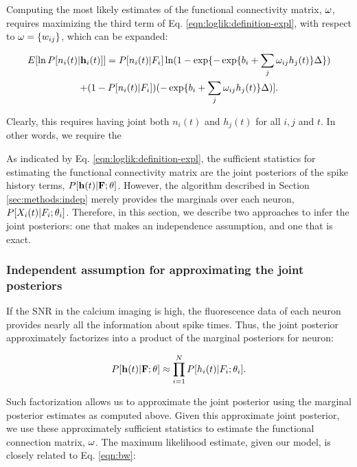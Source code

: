 Computing the most likely estimates of the functional connectivity matrix, $\mathbf{\omega}$, requires maximizing the third term of Eq. \eqref{eqn:loglik:definition-expl}, with respect to $\mathbf{\omega}=\{w_{ij}\}$, which can be expanded:

\begin{multline} \label{eqn:bws}
	E [\ln P[n_i(t) | \mathbf{h}_i(t)]] = P[n_i(t) | F_i] \ln (1-\exp\{-\exp\{b_i + \sum_j \omega_{ij} h_j(t)\}\Delta\})
	\\ +  (1-P[n_i(t) | F_i]) (-\exp\{b_i + \sum_j \omega_{ij} h_j(t)\}\Delta)].
\end{multline}

\noindent Clearly, this requires having joint both $n_i(t)$ and $h_j(t)$ for all $i,j$ and $t$.  In other words, we require the 

As indicated by Eq. \eqref{eqn:loglik:definition-expl}, the sufficient statistics for estimating the functional connectivity matrix are the joint posteriors of the spike history terms, $P[\mathbf{h}(t) | {\bf F}; \mathbf{\theta}]$.  However, the algorithm described in Section \ref{sec:methods:indep} merely provides the marginals over each neuron, $P[X_i(t) | F_i; \mathbf{\theta}_i]$.  Therefore, in this section, we describe two approaches to infer the joint posteriors: one that makes an independence assumption, and one that is exact.

\subsubsection{Independent assumption for approximating the joint posteriors}

If the SNR in the calcium imaging is high,  the fluorescence data of each neuron provides nearly all the information about spike times.  Thus, the joint posterior approximately factorizes into a product of the marginal posteriors for neuron:

\begin{equation} \label{eqn:indep_approx}
	P[{\bf h}(t)|{\bf F};\theta]  \approx \prod_{i=1}^N P[h_i(t)|F_i; \mathbf{\theta}_i]. \end{equation}
	
\noindent 

\noindent Such factorization allows us to approximate the joint posterior using the marginal posterior estimates as computed above.  Given this approximate joint posterior, we use these approximately sufficient statistics to estimate the functional connection matrix, $\mathbf{\omega}$.  The maximum likelihood estimate, given our model, is closely related to Eq. \eqref{eqn:bw}:

